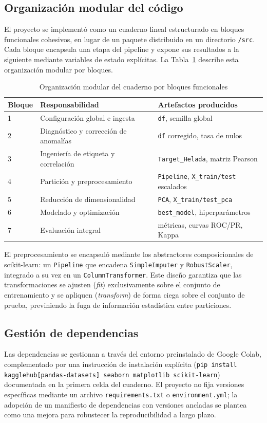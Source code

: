 \subsection{Organización modular del código}
El proyecto se implementó como un cuaderno lineal estructurado en bloques
funcionales cohesivos, en lugar de un paquete distribuido en un directorio
\texttt{/src}. Cada bloque encapsula una etapa del pipeline y expone sus
resultados a la siguiente mediante variables de estado explícitas. La
Tabla~\ref{tab:modules} describe esta organización modular por bloques.

\begin{table}[H]
\centering
\caption{Organización modular del cuaderno por bloques funcionales}
\label{tab:modules}
\footnotesize
\renewcommand{\arraystretch}{1.2}
\begin{tabular}{p{1.0cm}p{3.0cm}p{3.4cm}}
\toprule
\textbf{Bloque} & \textbf{Responsabilidad} & \textbf{Artefactos producidos} \\
\midrule
1 & Configuración global e ingesta & \texttt{df}, semilla global \\
2 & Diagnóstico y corrección de anomalías & \texttt{df} corregido, tasa de nulos \\
3 & Ingeniería de etiqueta y correlación & \texttt{Target\_Helada}, matriz Pearson \\
4 & Partición y preprocesamiento & \texttt{Pipeline}, \texttt{X\_train/test} escalados \\
5 & Reducción de dimensionalidad & \texttt{PCA}, \texttt{X\_train/test\_pca} \\
6 & Modelado y optimización & \texttt{best\_model}, hiperparámetros \\
7 & Evaluación integral & métricas, curvas ROC/PR, Kappa \\
\bottomrule
\end{tabular}
\end{table}

El preprocesamiento se encapsuló mediante los abstractores composicionales de
scikit-learn: un \texttt{Pipeline} que encadena \texttt{SimpleImputer} y
\texttt{RobustScaler}, integrado a su vez en un \texttt{ColumnTransformer}. Este
diseño garantiza que las transformaciones se ajusten (\emph{fit}) exclusivamente
sobre el conjunto de entrenamiento y se apliquen (\emph{transform}) de forma ciega
sobre el conjunto de prueba, previniendo la fuga de información estadística entre
particiones.

\subsection{Gestión de dependencias}
Las dependencias se gestionan a través del entorno preinstalado de Google Colab,
complementado por una instrucción de instalación explícita
(\texttt{pip install kagglehub[pandas-datasets] seaborn matplotlib scikit-learn})
documentada en la primera celda del cuaderno. El proyecto no fija versiones
específicas mediante un archivo \texttt{requirements.txt} o \texttt{environment.yml};
la adopción de un manifiesto de dependencias con versiones ancladas se plantea
como una mejora para robustecer la reproducibilidad a largo plazo.

